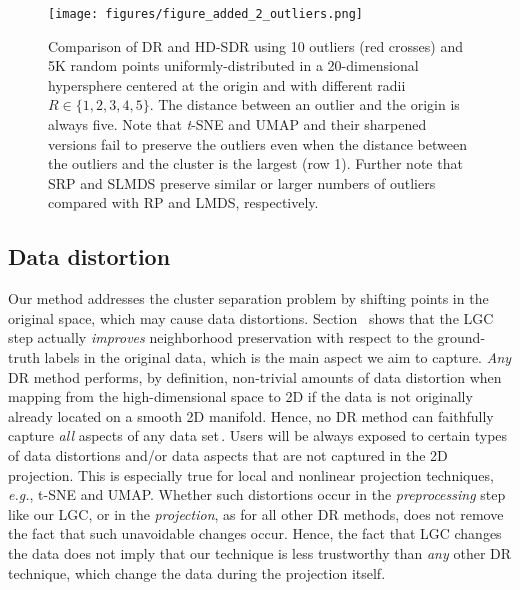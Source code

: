 \documentclass[sagev,Afour,times]{sagej}
\begin{document}
\begin{figure*}[htb]
    \centering
    \texttt{[image: figures/figure\_added\_2\_outliers.png]}
    \parbox[t]{0.95\columnwidth}{\relax}
    \caption{\label{fig:added_2_outliers}Comparison of DR and HD-SDR using 10 outliers (red crosses) and 5$\mathrm{K}$ random points uniformly-distributed in a 20-dimensional hypersphere centered at the origin and with different radii $R \in \{1,2,3,4,5\}$. The distance between an outlier and the origin is always five. Note that \emph{t}-SNE and UMAP and their sharpened versions fail to preserve the outliers even when the distance between the outliers and the cluster is the largest (row 1). Further note that SRP and SLMDS preserve similar or larger numbers of outliers compared with RP and LMDS, respectively.}
\end{figure*}


\subsection{Data distortion}
%
Our method addresses the cluster separation problem by shifting points in the original space, which may cause data distortions. Section~ shows that the LGC step actually \emph{improves} neighborhood preservation with respect to the ground-truth labels in the original data, which is the main aspect we aim to capture. \emph{Any} DR method performs, by definition, non-trivial amounts of data distortion when mapping from the high-dimensional space to 2D if the data is not originally already located on a smooth 2D manifold. Hence, no DR method can faithfully capture \emph{all} aspects of any data set\,\cite{mateusDR_survey2019}. Users will be always exposed to certain types of data distortions and/or data aspects that are not captured in the 2D projection. This is especially true for local and nonlinear projection techniques, \emph{e.g.}, t-SNE and UMAP. Whether such distortions occur in the \emph{preprocessing} step like our LGC, or in the \emph{projection}, as for all other DR methods, does not remove the fact that such unavoidable changes occur. Hence, the fact that LGC changes the data does not imply that our technique is less trustworthy than \emph{any} other DR technique, which change the data during the projection itself.

\end{document}
